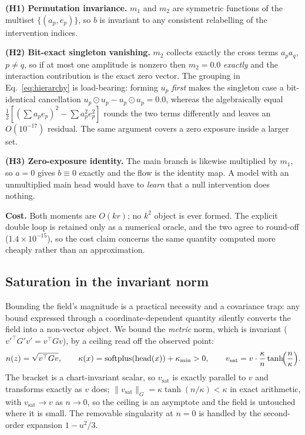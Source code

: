 \documentclass{article}
\begin{document}
\textbf{(H1) Permutation invariance.} $m_{1}$ and $m_{2}$ are symmetric functions of the
multiset $\{(a_{p}, e_{p})\}$, so $b$ is invariant to any consistent relabelling of the
intervention indices.

\textbf{(H2) Bit-exact singleton vanishing.} $m_{2}$ collects exactly the cross terms
$a_{p}a_{q}$, $p \neq q$, so if at most one amplitude is nonzero then $m_{2} = 0.0$
\emph{exactly} and the interaction contribution is the exact zero vector. The grouping in
Eq.~\ref{eq:hierarchy} is load-bearing: forming $u_{p}$ \emph{first} makes the singleton case
a bit-identical cancellation $u_{p}\odot u_{p} - u_{p}\odot u_{p} = 0.0$, whereas the
algebraically equal $\tfrac12[(\sum a_{p}e_{p})^{2} - \sum a_{p}^{2}e_{p}^{2}]$ rounds the two
terms differently and leaves an $O(10^{-17})$ residual. The same argument covers a zero
exposure inside a larger set.

\textbf{(H3) Zero-exposure identity.} The main branch is likewise multiplied by $m_{1}$, so
$a = 0$ gives $b \equiv 0$ exactly and the flow is the identity map. A model with an
unmultiplied main head would have to \emph{learn} that a null intervention does nothing.

\textbf{Cost.} Both moments are $O(kr)$; no $k^{2}$ object is ever formed. The explicit
double loop is retained only as a numerical oracle, and the two agree to round-off
($1.4\times10^{-15}$), so the cost claim concerns the same quantity computed more cheaply
rather than an approximation.

\subsection{Saturation in the invariant norm}
\label{sec:sat}

Bounding the field's magnitude is a practical necessity and a covariance trap: any bound
expressed through a coordinate-dependent quantity silently converts the field into a
non-vector object. We bound the \emph{metric} norm, which is invariant
($v'^{\top}G'v' = v^{\top}Gv$), by a ceiling read off the observed point:
\begin{equation}
n(z) = \sqrt{v^{\top} G v}, \qquad
\kappa(x) = \mathrm{softplus}(\mathrm{head}(x)) + \kappa_{\min} > 0, \qquad
v_{\mathrm{sat}} = v \cdot \frac{\kappa}{n}\tanh\!\Bigl(\frac{n}{\kappa}\Bigr).
\label{eq:sat}
\end{equation}
The bracket is a chart-invariant scalar, so $v_{\mathrm{sat}}$ is exactly parallel to $v$ and
transforms exactly as $v$ does; $\|v_{\mathrm{sat}}\|_{G} = \kappa\tanh(n/\kappa) < \kappa$
in exact arithmetic, with $v_{\mathrm{sat}} \to v$ as $n \to 0$, so the ceiling is an
asymptote and the field is untouched where it is small. The removable singularity at $n=0$
is handled by the second-order expansion $1 - u^{2}/3$.
\end{document}

